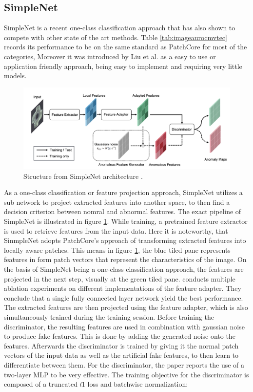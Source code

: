 \subsection{SimpleNet}
\label{subsec:simplenet}
SimpleNet \cite{liu2023simplenet} is a recent one-class classification approach that has also shown to compete with other state of the art methods. Table \ref{tab:imageaurocmvtec} records its performance to be on the same standard as PatchCore 
for most of the categories, %
Moreover it was introduced by Liu et al. as a easy to use or application friendly approach, being easy to implement and requiring very little models.

\begin{figure}[ht]
    \centering
    \includegraphics[width=\textwidth]{figures/simplenet_architecture.png}
    \caption{Structure from SimpleNet architecture \cite{liu2023simplenet}.}
    \label{fig:simplenetpipeline}
\end{figure}

As a one-class classification or feature projection approach, SimpleNet utilizes a sub network to project extracted features into another space, to then find a decision criterion between nomral and 
abnormal features. The exact pipeline of SimpleNet is illustrated in figure \ref{fig:simplenetpipeline}. While training, a pretrained feature extractor is used to retrieve features from the input data. Here it is noteworthy, 
that SinmpleNet adopts PatchCore's approach of transforming extracted features into locally aware patches. This means in figure \ref{fig:simplenetpipeline}, the blue tiled pane represents features in form patch vectors 
that represent the characteristics of the image. On the basis of SimpleNet being a one-class classification approach, the features are projected in the next step, visually at the green tiled pane. 
\cite{liu2023simplenet} conducts multiple ablation experiments on different implementations of the feature adapter. They conclude that a single fully connected layer network yield the best 
performance. The extracted features are then projected using the feature adapter, which is also simultaneously trained during the training session. Before training the discriminator, the resulting 
features are used in combination with gaussian noise to produce fake features. This is done by adding the generated noise onto the features. Afterwards the discriminator is trained by giving it 
the normal patch vectors of the input data as well as the artificial fake features, to then learn to differentiate between them. For the discriminator, the paper reports the use of a two-layer 
MLP to be very effective. The training objective for the discriminator is composed of a truncated $l1$ loss and batchwise normalization:

